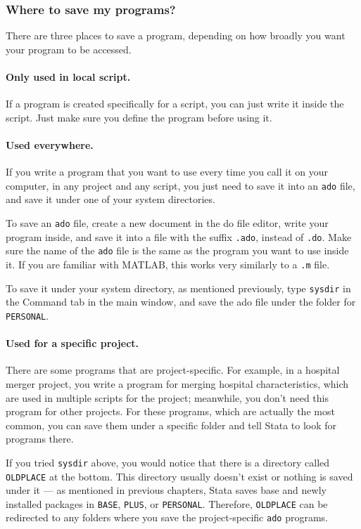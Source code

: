 \subsubsection{Where to save my programs?}
There are three places to save a program, depending on how broadly you want your program to be accessed. 

\paragraph{Only used in local script.} If a program is created specifically for a script, you can just write it inside the script. Just make sure you define the program before using it. 

\paragraph{Used everywhere.} If you write a program that you want to use every time you call it on your computer, in any project and any script, you just need to save it into an \verb|ado| file, and save it under one of your system directories. 

To save an \verb|ado| file, create a new document in the do file editor, write your program inside, and save it into a file with the suffix \verb|.ado|, instead of \verb|.do|. Make sure the name of the \verb|ado| file is the same as the program you want to use inside it. If you are familiar with MATLAB, this works very similarly to a \verb|.m| file. 

To save it under your system directory, as mentioned previously, type \verb|sysdir| in the Command tab in the main window, and save the ado file under the folder for \verb|PERSONAL|.

\paragraph{Used for a specific project.} There are some programs that are project-specific. For example, in a hospital merger project, you write a program for merging hospital characteristics, which are used in multiple scripts for the project; meanwhile, you don't need this program for other projects. For these programs, which are actually the most common, you can save them under a specific folder and tell Stata to look for programs there.

If you tried \verb|sysdir| above, you would notice that there is a directory called \verb|OLDPLACE| at the bottom. This directory usually doesn't exist or nothing is saved under it --- as mentioned in previous chapters, Stata saves base and newly installed packages in \verb|BASE|, \verb|PLUS|, or \verb|PERSONAL|. Therefore, \verb|OLDPLACE| can be redirected to any folders where you save the project-specific \verb|ado| programs. 

